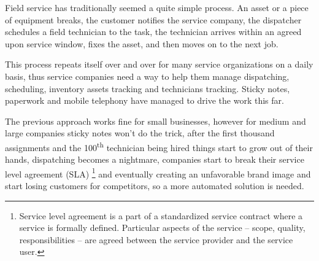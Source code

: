 Field service has traditionally seemed a quite simple process. An asset or a piece of equipment breaks, the customer notifies the service company, the dispatcher schedules a field technician to the task, the technician arrives within an agreed upon service window, fixes the asset, and then moves on to the next job.

This process repeats itself over and over for many service organizations on a daily basis, thus service companies need a way to help them manage dispatching, scheduling, inventory assets tracking and technicians tracking. Sticky notes, paperwork and mobile telephony have managed to drive the work this far.

The previous approach works fine for small businesses, however for medium and large companies sticky notes won't do the trick, after the first thousand assignments and the 100\textsuperscript{th} technician being hired things start to grow out of their hands, dispatching becomes a nightmare, companies start to break their service level agreement (SLA) \footnote{Service level agreement is a part of a standardized service contract where a service is formally defined. Particular aspects of the service – scope, quality, responsibilities – are agreed between the service provider and the service user.} and eventually creating an unfavorable brand image and start losing customers for competitors, so a more automated solution is needed.
